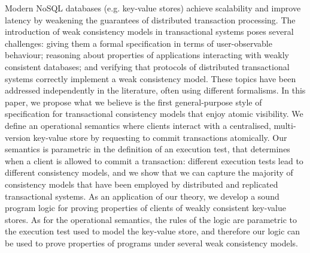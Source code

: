 Modern NoSQL databases (e.g. key-value stores) achieve scalability and improve 
latency by weakening the guarantees of distributed transaction 
processing. 
The introduction of weak consistency models in transactional systems 
poses several challenges: giving them a formal specification in terms 
of user-observable behaviour; reasoning about properties of applications 
interacting with weakly consistent databases; and verifying that protocols 
of distributed transactional systems correctly implement a weak consistency model. 
These topics have been addressed independently in the literature, often using 
different formalisms. 
In this paper, we propose what we believe is the first general-purpose style 
of specification for transactional consistency models that enjoy atomic visibility. 
We define an operational semantics where clients interact with a centralised, 
multi-version key-value store by requesting to commit transactions atomically. 
Our semantics is parametric in the definition of an execution test, that determines 
when a client is allowed to commit a transaction: different execution tests lead 
to different consistency models, and we show that we can capture the majority 
of consistency models that have been employed by distributed and replicated 
transactional systems. 
As an application of our theory, we develop a sound program logic for 
proving properties of clients of weakly consistent key-value stores. 
As for the operational semantics, the rules of the logic are parametric to the execution 
test used to model the key-value store, and therefore our logic can be used 
to prove properties of programs under several weak consistency models.



